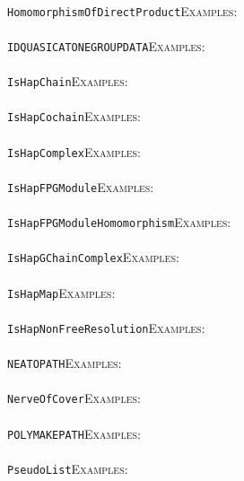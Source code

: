 \documentclass[a4paper,11pt]{report}
\begin{document}
{{ \\
 \texttt{HomomorphismOfDirectProduct}{\nobreakspace}{\nobreakspace}{\nobreakspace}{\nobreakspace}\textsc{Examples:} \\
 \\
 \texttt{IDQUASICATONEGROUP{\textunderscore}DATA}{\nobreakspace}{\nobreakspace}{\nobreakspace}{\nobreakspace}\textsc{Examples:} \\
 \\
 \texttt{IsHapChain}{\nobreakspace}{\nobreakspace}{\nobreakspace}{\nobreakspace}\textsc{Examples:} \\
 \\
 \texttt{IsHapCochain}{\nobreakspace}{\nobreakspace}{\nobreakspace}{\nobreakspace}\textsc{Examples:} \\
 \\
 \texttt{IsHapComplex}{\nobreakspace}{\nobreakspace}{\nobreakspace}{\nobreakspace}\textsc{Examples:} \\
 \\
 \texttt{IsHapFPGModule}{\nobreakspace}{\nobreakspace}{\nobreakspace}{\nobreakspace}\textsc{Examples:} \\
 \\
 \texttt{IsHapFPGModuleHomomorphism}{\nobreakspace}{\nobreakspace}{\nobreakspace}{\nobreakspace}\textsc{Examples:} \\
 \\
 \texttt{IsHapGChainComplex}{\nobreakspace}{\nobreakspace}{\nobreakspace}{\nobreakspace}\textsc{Examples:} \\
 \\
 \texttt{IsHapMap}{\nobreakspace}{\nobreakspace}{\nobreakspace}{\nobreakspace}\textsc{Examples:} \\
 \\
 \texttt{IsHapNonFreeResolution}{\nobreakspace}{\nobreakspace}{\nobreakspace}{\nobreakspace}\textsc{Examples:} \\
 \\
 \texttt{NEATO{\textunderscore}PATH}{\nobreakspace}{\nobreakspace}{\nobreakspace}{\nobreakspace}\textsc{Examples:} \\
 \\
 \texttt{NerveOfCover}{\nobreakspace}{\nobreakspace}{\nobreakspace}{\nobreakspace}\textsc{Examples:} \\
 \\
 \texttt{POLYMAKE{\textunderscore}PATH}{\nobreakspace}{\nobreakspace}{\nobreakspace}{\nobreakspace}\textsc{Examples:} \\
 \\
 \texttt{PseudoList}{\nobreakspace}{\nobreakspace}{\nobreakspace}{\nobreakspace}\textsc{Examples:} \\
}}
\end{document}
